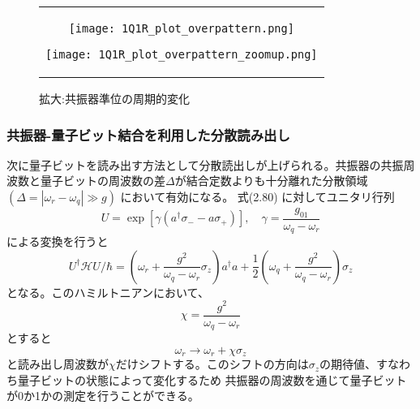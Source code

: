         \begin{figure}[H]
            \begin{center}
                \begin{tabular}{c}
                    \begin{minipage}{0.5\hsize}
                        \begin{center}
                            \texttt{[image: 1Q1R\_plot\_overpattern.png]}
                        \end{center}
                        \caption{$\omega_r>\omega_q^{01}$の場合の準位図}
                    \end{minipage}
                    
                    \begin{minipage}{0.5\hsize}
                        \begin{center}
                            \texttt{[image: 1Q1R\_plot\_overpattern\_zoomup.png]}
                        \end{center}
                        \caption{拡大:共振器準位の周期的変化}
                    \end{minipage}
                \end{tabular}
            \end{center}
        \end{figure}
        \subsubsection{共振器-量子ビット結合を利用した分散読み出し}
        次に量子ビットを読み出す方法として分散読出しが上げられる。共振器の共振周波数と量子ビットの周波数の差$\Delta$が結合定数よりも十分離れた分散領域$(\Delta = |\omega_r − \omega_q|\gg g)$ において有効になる。
        式(2.80) に対してユニタリ行列
        \begin{equation}
            U=\exp \left[\gamma\left(a^{\dagger} \sigma_{-}-a \sigma_{+}\right)\right], \quad \gamma=\frac{g_{01}}{\omega_{q}-\omega_{r}}
        \end{equation}
        による変換を行うと
        \begin{equation}
            U^\dagger \mathcal{H} U/ \hbar=\left(\omega_{r}+\frac{g^{2}}{\omega_q-\omega_r}\sigma_{z}\right) a^{\dagger} a+\frac{1}{2}\left(\omega_{q}+\frac{g^{2}}{\omega_q-\omega_r}\right) \sigma_{z}
        \end{equation}
        となる。このハミルトニアンにおいて、
        \begin{equation}
            \chi = \frac{g^2}{\omega_q-\omega_r}
        \end{equation}
        とすると
        \begin{equation}
            \omega_r \to \omega_r + \chi \sigma_z
        \end{equation}
        と読み出し周波数が$\chi$だけシフトする。このシフトの方向は$\sigma_z$の期待値、すなわち量子ビットの状態によって変化するため
        共振器の周波数を通じて量子ビットが0か1かの測定を行うことができる。

